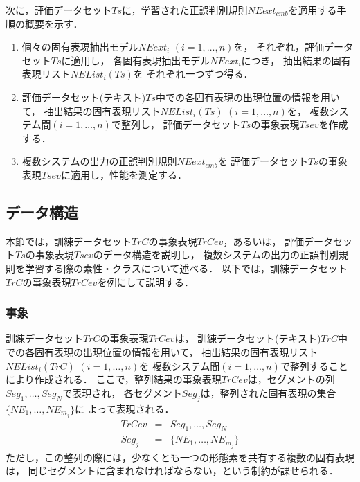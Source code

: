 次に，評価データセット$Ts$に，学習された正誤判別規則$NEext_{cmb}$を適用する手順の概要を示す．
\begin{enumerate}
\item\label{enum:evproc1}
	個々の固有表現抽出モデル$NEext_i$ $(i=1,\ldots,n)$を，
	それぞれ，評価データセット$Ts$に適用し，
	各固有表現抽出モデル$NEext_i$につき，
	抽出結果の固有表現リスト$NEList_i(Ts)$を
	それぞれ一つずつ得る．
\item 評価データセット(テキスト)$Ts$中での各固有表現の出現位置の情報を用いて，
	抽出結果の固有表現リスト$NEList_i(Ts)$ $(i\!=\!1,\ldots,n)$を，
	複数システム間$(i\!=\!1,\ldots,n)$で整列し，
	評価データセット$Ts$の事象表現$Tsev$を作成する．
\item 複数システムの出力の正誤判別規則$NEext_{cmb}$を
	評価データセット$Ts$の事象表現$Tsev$に適用し，性能を測定する．
\end{enumerate}

\subsection{データ構造}
\label{subsec:expr}

本節では，訓練データセット$TrC$の事象表現$TrCev$，あるいは，
評価データセット$Ts$の事象表現$Tsev$のデータ構造を説明し，
複数システムの出力の正誤判別規則を学習する際の素性・クラスについて述べる．
以下では，訓練データセット$TrC$の事象表現$TrCev$を例にして説明する．

\subsubsection{事象}
\label{subsubsec:event}

訓練データセット$TrC$の事象表現$TrCev$は，
訓練データセット(テキスト)$TrC$中での各固有表現の出現位置の情報を用いて，
抽出結果の固有表現リスト$NEList_i(TrC)$ $(i\!=\!1,\ldots,n)$を
複数システム間$(i\!=\!1,\ldots,n)$で整列することにより作成される．
ここで，整列結果の事象表現$TrCev$は，セグメントの列$Seg_1,\ldots,Seg_N$で表現され，
各セグメント$Seg_j$は，整列された固有表現の集合$\{ NE_1,\ldots,NE_{m_j} \}$に
よって表現される． 
\begin{eqnarray*}
 TrCev & = & Seg_1,\ldots,Seg_N \\
 Seg_j & = & \{ NE_1,\ldots,NE_{m_j} \} 
\end{eqnarray*}
ただし，この整列の際には，少なくとも一つの形態素を共有する複数の固有表現は，
同じセグメントに含まれなければならない，という制約が課せられる．

